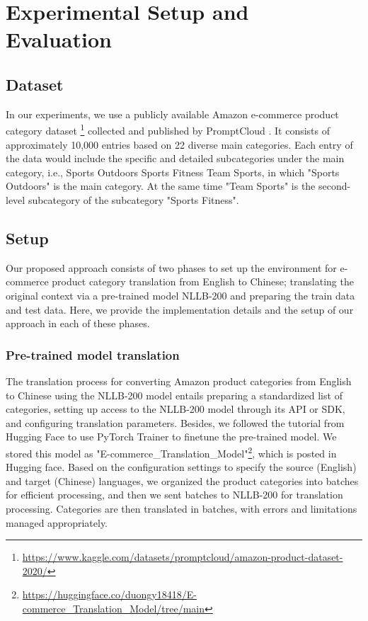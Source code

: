 \documentclass[sigconf]{acmart}
\begin{document}
\section{Experimental Setup and Evaluation}\label{experiment}

\subsection{Dataset}
In our experiments, we use a publicly available Amazon e-commerce product category dataset \footnote{\href{https://www.kaggle.com/datasets/promptcloud/amazon-product-dataset-2020/}{https://www.kaggle.com/datasets/promptcloud/amazon-product-dataset-2020/}} collected and published by PromptCloud \cite{best_web_scraping_services_provider_company_2021}. It consists of approximately 10,000 entries based on 22 diverse main categories. Each entry of the data would include the specific and detailed subcategories under the main category, i.e., Sports Outdoors Sports Fitness Team Sports, in which "Sports Outdoors" is the main category. At the same time "Team Sports" is the second-level subcategory of the subcategory "Sports Fitness".

\subsection{Setup}
Our proposed approach consists of two phases to set up the environment for e-commerce product category translation from English to Chinese; translating the original context via a pre-trained model NLLB-200 and preparing the train data and test data. Here, we provide the implementation details and the setup of our approach in each of these phases. 

\subsubsection{Pre-trained model translation}
The translation process for converting Amazon product categories from English to Chinese using the NLLB-200 model entails preparing a standardized list of categories, setting up access to the NLLB-200 model through its API or SDK, and configuring translation parameters. Besides, we followed the tutorial from Hugging Face\cite{Hugging_Face} to use PyTorch Trainer to finetune the pre-trained model\cite{min_ross_elior_sulem_veyseh_thien_huu_nguyen_sainz_agirre_heintz_roth_2023}. We stored this model as "E-commerce\_Translation\_Model"\footnote{\href{https://huggingface.co/duongy18418/E-commerce_Translation_Model/tree/main}{https://huggingface.co/duongy18418/E-commerce\_Translation\_Model/tree/main}}, which is posted in Hugging face. Based on the configuration settings to specify the source (English) and target (Chinese) languages, we organized the product categories into batches for efficient processing, and then we sent batches to NLLB-200 for translation processing. Categories are then translated in batches, with errors and limitations managed appropriately. 
\end{document}
